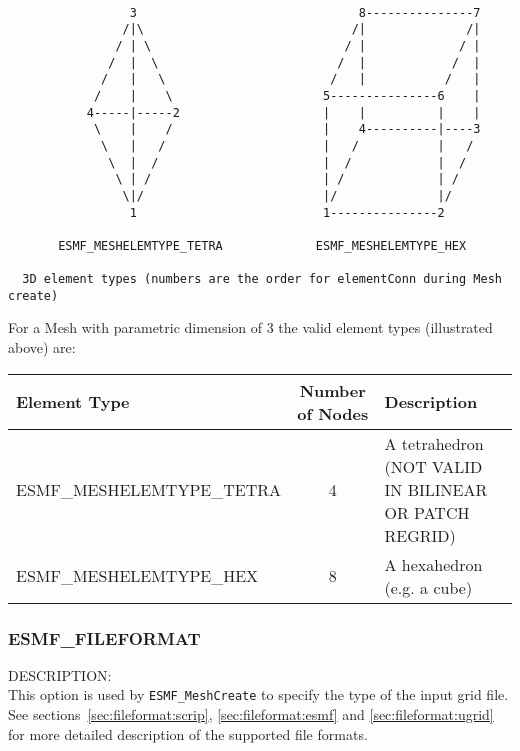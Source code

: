 \begin{verbatim}
                                            
                 3                               8---------------7
                /|\                             /|              /|
               / | \                           / |             / |
              /  |  \                         /  |            /  |
             /   |   \                       /   |           /   |
            /    |    \                     5---------------6    |
           4-----|-----2                    |    |          |    |
            \    |    /                     |    4----------|----3
             \   |   /                      |   /           |   /
              \  |  /                       |  /            |  /
               \ | /                        | /             | /
                \|/                         |/              |/
                 1                          1---------------2

       ESMF_MESHELEMTYPE_TETRA             ESMF_MESHELEMTYPE_HEX  

  3D element types (numbers are the order for elementConn during Mesh create)

\end{verbatim}

For a Mesh with parametric dimension of 3 the valid element types (illustrated above) are:

\smallskip

\begin{tabular}{|l|c|l|}
\hline
Element Type & Number of Nodes & Description \\
\hline                                         
ESMF\_MESHELEMTYPE\_TETRA & 4 & A tetrahedron (NOT VALID IN BILINEAR OR PATCH REGRID)\\
ESMF\_MESHELEMTYPE\_HEX  & 8 & A hexahedron (e.g. a cube) \\
\hline
\end{tabular}

\subsubsection{ESMF\_FILEFORMAT}
\label{const:mesh:fileformat}

{\sf DESCRIPTION:\\}
This option is used by {\tt ESMF\_MeshCreate} to specify the type of the input grid file.  See 
sections~\ref{sec:fileformat:scrip}, \ref{sec:fileformat:esmf} and \ref{sec:fileformat:ugrid} for more 
detailed description of the supported file formats.

